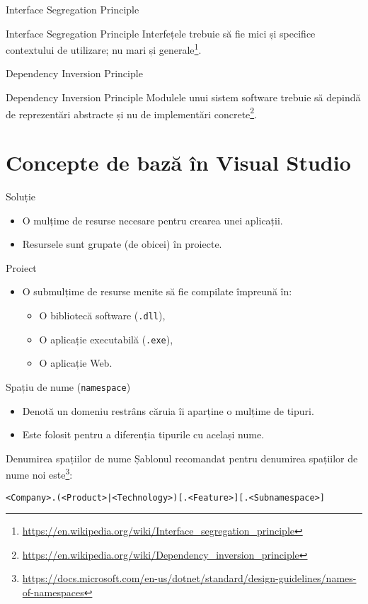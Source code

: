 \documentclass[presentation]{beamer}
\begin{document}
\begin{frame}[label={sec:orgdb7cb3f}]{Interface Segregation Principle}
\begin{block}{Interface Segregation Principle}
Interfețele trebuie să fie mici și specifice contextului de utilizare; nu mari și generale\footnote{\url{https://en.wikipedia.org/wiki/Interface\_segregation\_principle}}.
\end{block}
\end{frame}
\begin{frame}[label={sec:org1269d28}]{Dependency Inversion Principle}
\begin{block}{Dependency Inversion Principle}
Modulele unui sistem software trebuie să depindă de reprezentări abstracte și nu de implementări concrete\footnote{\url{https://en.wikipedia.org/wiki/Dependency\_inversion\_principle}}.
\end{block}
\end{frame}
\section{Concepte de bază în Visual Studio}
\label{sec:orge6bc502}
\begin{frame}[label={sec:orga67f53c}]{Soluție}
\begin{itemize}
\item O mulțime de resurse necesare pentru crearea unei aplicații.
\item Resursele sunt grupate (de obicei) în proiecte.
\end{itemize}
\end{frame}
\begin{frame}[label={sec:org98cb3eb},fragile]{Proiect}
 \begin{itemize}
\item O submulțime de resurse menite să fie compilate împreună în:
\begin{itemize}
\item O bibliotecă software (\texttt{.dll}),
\item O aplicație executabilă (\texttt{.exe}),
\item O aplicație Web.
\end{itemize}
\end{itemize}
\end{frame}
\begin{frame}[label={sec:org63daafe},fragile]{Spațiu de nume (\texttt{namespace})}
 \begin{itemize}
\item Denotă un domeniu restrâns căruia îi aparține o mulțime de tipuri.
\item Este folosit pentru a diferenția tipurile cu același nume.
\end{itemize}
\end{frame}
\begin{frame}[label={sec:org55572f9},fragile]{Denumirea spațiilor de nume}
 Șablonul recomandat pentru denumirea spațiilor de nume noi este\footnote{\url{https://docs.microsoft.com/en-us/dotnet/standard/design-guidelines/names-of-namespaces}}:
\begin{verbatim}
<Company>.(<Product>|<Technology>)[.<Feature>][.<Subnamespace>]
\end{verbatim}
\end{frame}
\end{document}
